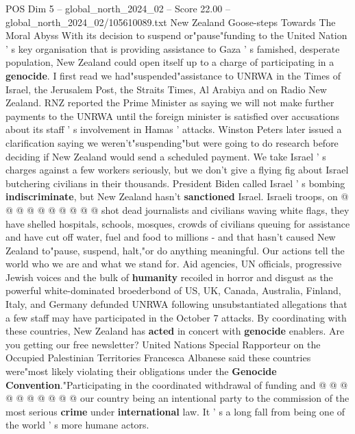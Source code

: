 \begin{textsample}{POS Dim 5 – global\_north\_2024\_02 – Score 22.00 – global\_north\_2024\_02/105610089.txt}  \label{ex:f5_pos_233}
New Zealand Goose-steps Towards The Moral Abyss With its decision to suspend or"pause"funding to the United Nation ' s key organisation that is providing assistance to Gaza ' s famished, desperate population, New Zealand could open itself up to a charge of participating in a \textbf{genocide}.
I first read we had"suspended"assistance to UNRWA in the Times of Israel, the Jerusalem Post, the Straits Times, Al Arabiya and on Radio New Zealand.
RNZ reported the Prime Minister as saying we will not make further payments to the UNRWA until the foreign minister is satisfied over accusations about its staff ' s involvement in Hamas ' attacks.
Winston Peters later issued a clarification saying we weren't"suspending"but were going to do research before deciding if New Zealand would send a scheduled payment.
We take Israel ' s charges against a few workers seriously, but we don't give a flying fig about Israel butchering civilians in their thousands.
President Biden called Israel ' s bombing \textbf{indiscriminate}, but New Zealand hasn't \textbf{sanctioned} Israel.
Israeli troops, on @ @ @ @ @ @ @ @ @ @ shot dead journalists and civilians waving white flags, they have shelled hospitals, schools, mosques, crowds of civilians queuing for assistance and have cut off water, fuel and food to millions - and that hasn't caused New Zealand to"pause, suspend, halt,"or do anything meaningful.
Our actions tell the world who we are and what we stand for.
Aid agencies, UN officials, progressive Jewish voices and the bulk of \textbf{humanity} recoiled in horror and disgust as the powerful white-dominated broederbond of US, UK, Canada, Australia, Finland, Italy, and Germany defunded UNRWA following unsubstantiated allegations that a few staff may have participated in the October 7 attacks.
By coordinating with these countries, New Zealand has \textbf{acted} in concert with \textbf{genocide} enablers.
Are you getting our free newsletter?
United Nations Special Rapporteur on the Occupied Palestinian Territories Francesca Albanese said these countries were"most likely violating their obligations under the \textbf{Genocide} \textbf{Convention}."Participating in the coordinated withdrawal of funding and @ @ @ @ @ @ @ @ @ @ our country being an intentional party to the commission of the most serious \textbf{crime} under \textbf{international} law.
It ' s a long fall from being one of the world ' s more humane actors.

\end{textsample}
